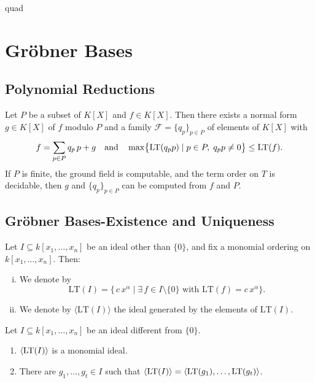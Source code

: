 quad\chapter{Gr{\"o}bner Bases} 

\section{Polynomial Reductions}

\begin{theorem}
\label{thm:div_alg}
  \leanok
  Let $P$ be a subset of $K[X]$ and $f\in K[X]$.
  Then there exists a normal form $g\in K[X]$ of $f$ modulo $P$ and a family $\mathcal{F}=\{q_{p}\}_{p\in P}$ of elements of $K[X]$ with
  \[
    f=\sum_{p\in P}q_{p}\,p + g
    \quad\text{and}\quad
    \max\bigl\{\operatorname{LT}(q_{p}p)\mid p\in P,\;q_{p}p\neq 0\bigr\}\le \operatorname{LT}(f).
  \]
  If $P$ is finite, the ground field is computable, and the term order on $T$ is decidable, 
  then $g$ and $\{q_{p}\}_{p\in P}$ can be computed from $f$ and $P$.
\end{theorem}

\section{Gr{\"o}bner Bases-Existence and Uniqueness}

\begin{definition}
  \label{def:initialIdeal}
  \leanok %
  Let \(I\subseteq k[x_1,\dots,x_n]\) be an ideal other than \(\{0\}\), and fix a monomial ordering on \(k[x_1,\dots,x_n]\).  Then:
  \begin{enumerate}[(i)]
    \item We denote by
    \[
      \mathrm{LT}(I)
      =
      \{\,c\,x^\alpha \mid \exists\,f\in I\setminus\{0\}\text{ with }\mathrm{LT}(f)=c\,x^\alpha\}.
    \]
    \item We denote by \(\langle \mathrm{LT}(I)\rangle\) the ideal generated by the elements of \(\mathrm{LT}(I)\).
  \end{enumerate}
\end{definition}

\begin{theorem} %
    \label{thm:initialIdeal_is_FG}
    \leanok %
    Let $I \subseteq k[x_1, \ldots , x_n]$ be an ideal different from $\{ 0 \}$.
    \begin{enumerate}
        \item $\langle\operatorname{LT}(I)\rangle$ is a monomial ideal.
        \item There are $g_1, \ldots , g_t \in I$ such that $\langle \operatorname{LT}(I)\rangle = \langle \operatorname{LT}(g_1), \ldots , \operatorname{LT}(g_t)\rangle$.
    \end{enumerate}
\end{theorem}

